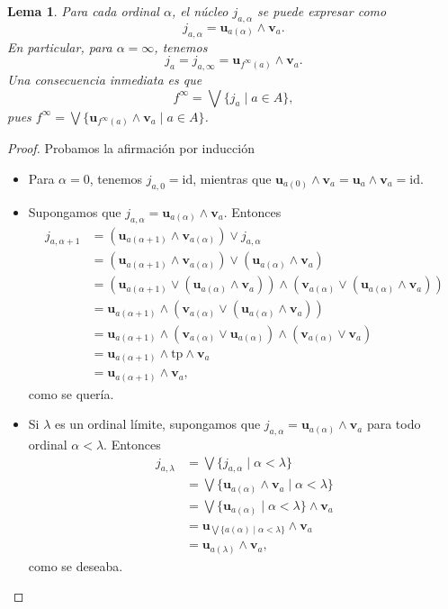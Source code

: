 \documentclass[12pt,letterpaper,titlepage]{article}
\newtheorem{lemma}{Lema}
\theoremstyle{definition}
\renewcommand\sup{\vee}
\newcommand\Sup{\bigvee}
\renewcommand\inf{\wedge}
\newcommand\unuc[1]{\mathbf u_{#1}}
\newcommand\vnuc[1]{\mathbf v_{#1}}
\newcommand\<{\langle}
\renewcommand\>{\rangle}
\newcommand{\id}{\mathrm{id}}
\newcommand{\tp}{\mathrm{tp}}
\begin{document}
\begin{lemma}
  Para cada ordinal $\alpha$, el núcleo $j_{a,\alpha}$ se puede
  expresar como
  \[
    j_{a,\alpha} = \unuc{a(\alpha)} \inf \vnuc a
  .\]
  En particular, para $\alpha=\infty$, tenemos
  \[
    j_a = j_{a,\infty} = \unuc{f^\infty(a)}\inf\vnuc a
  .\]
  Una consecuencia inmediata es que
  \[
    f^\infty = \Sup\{j_a \mid a\in A\}
  ,\]
  pues
  $f^\infty = \Sup\{\unuc{f^\infty(a)}\inf\vnuc a \mid a\in A\}$.
\end{lemma}
\begin{proof}
  Probamos la afirmación por inducción
  \begin{itemize}
    \item Para $\alpha=0$, tenemos $j_{a,0}=\id$, mientras que
    $\unuc{a(0)}\inf \vnuc a = \unuc a \inf \vnuc a = \id$.
    \item Supongamos que
    $j_{a,\alpha} = \unuc{a(\alpha)} \inf \vnuc a$.
    Entonces
    \begin{align*}
      j_{a,\alpha+1}
      &= (\unuc {a(\alpha+1)}\inf \vnuc {a(\alpha)})
        \sup j_{a,\alpha} \\
      &= (\unuc {a(\alpha+1)}\inf \vnuc {a(\alpha)})
        \sup (\unuc{a(\alpha)} \inf \vnuc a) \\
      &=
      (\unuc {a(\alpha+1)}\sup (\unuc{a(\alpha)} \inf \vnuc a))
      \inf(\vnuc {a(\alpha)}\sup (\unuc{a(\alpha)} \inf \vnuc a)) \\
      &= \unuc {a(\alpha+1)}
      \inf(\vnuc {a(\alpha)}\sup (\unuc{a(\alpha)} \inf \vnuc a)) \\
      &= \unuc {a(\alpha+1)}
      \inf(\vnuc {a(\alpha)}\sup\unuc{a(\alpha)})
      \inf(\vnuc {a(\alpha)}\sup \vnuc a) \\
      &= \unuc {a(\alpha+1)} \inf \tp \inf \vnuc a \\
      &= \unuc {a(\alpha+1)}\inf \vnuc a,
    \end{align*}
    como se quería.
    \item Si $\lambda$ es un ordinal límite, supongamos que 
    $j_{a,\alpha} = \unuc{a(\alpha)} \inf \vnuc a$ para todo
    ordinal $\alpha <\lambda$.
    Entonces
    \begin{align*}
      j_{a,\lambda}
      &= \Sup\{j_{a,\alpha} \mid \alpha<\lambda\} \\
      &= \Sup\{\unuc{a(\alpha)}\inf\vnuc a \mid\alpha<\lambda\}
      \\
      &= \Sup\{\unuc{a(\alpha)}\mid\alpha<\lambda\}\inf\vnuc a \\
      &= \unuc{\Sup\{a(\alpha)\mid\alpha<\lambda\}}\inf\vnuc a \\
      &= \unuc{a(\lambda)}\inf\vnuc a,
    \end{align*}
    como se deseaba.
  \end{itemize}
\end{proof}
\end{document}
